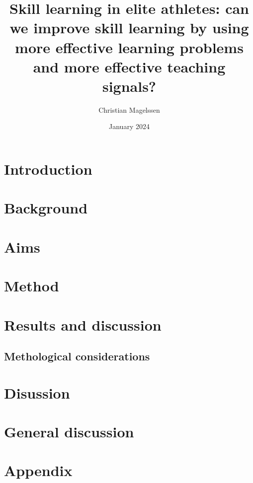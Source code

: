 \documentclass{report}
\title{Skill learning in elite athletes: can we improve skill learning by using more effective learning problems and more effective teaching signals?}
\author{Christian Magelssen}
\date{January 2024}
\begin{document}
\newcommand{\RNum}[1]{\uppercase\expandafter{\romannumeral #1\relax}}

\maketitle

\tableofcontents 
\listoffigures




\chapter{Introduction}


\chapter{Background}


\chapter{Aims}



\chapter{Method}



\chapter{Results and discussion}



\section{Methological considerations}


\chapter{Disussion}




\chapter{General discussion}


\chapter{Appendix}


\printbibliography
\end{document}
